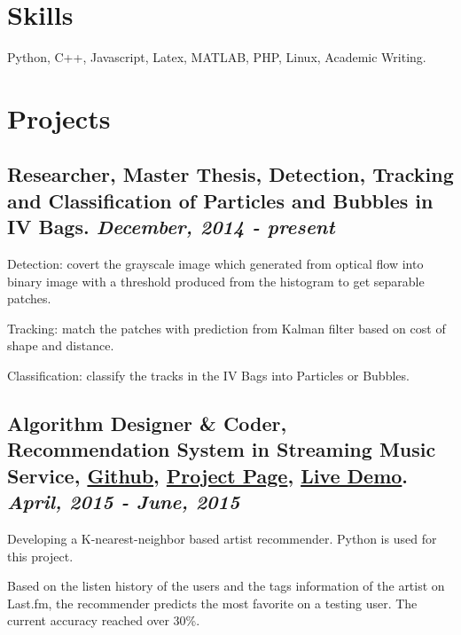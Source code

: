 \documentclass[letterpaper,8pt]{extarticle}
\newlength{\wideitemsep}
\let\olditem\item
\renewcommand{\item}{\setlength{\itemsep}{\wideitemsep}\olditem}
\renewenvironment{itemize}{
  \begin{list}{}{
    \setlength{\leftmargin}{1.5em}
  }
}{
  \end{list}
}
\begin{document}
\section*{Skills \noindent\hrulefill}
\begin{itemize}
	\item[$\circ$] Python, C++, Javascript, Latex, MATLAB, PHP, Linux, Academic Writing.
\end{itemize}

\section*{Projects \noindent\hrulefill}

\subsection*{\textbf{Researcher, Master Thesis}, Detection, Tracking and Classification of Particles and Bubbles in IV Bags. \hfill {\it December, 2014 - present}}
\begin{itemize}
	\item[$\circ$] Detection: covert the grayscale image which generated from optical flow into binary image with a threshold produced from the histogram to get separable patches.
	\item[$\circ$] Tracking: match the patches with prediction from Kalman filter based on cost of shape and distance.
	\item[$\circ$] Classification: classify the tracks in the IV Bags into Particles or Bubbles.
\end{itemize}

\subsection*{\textbf{Algorithm Designer \& Coder}, Recommendation System in Streaming Music Service,
\href{https://github.com/Yaliang/last.fm-recommender}{\color[rgb]{0.2, 0.7, 0.7} Github}, \href{http://smarturl.it/coolrecommender}{\color[rgb]{0.2, 0.7, 0.7} Project Page}, \href{http://yaliang.github.io/last.fm-recommender/Dashboard.html}{\color[rgb]{0.2, 0.7, 0.7} Live Demo}. \hfill {\it April, 2015 - June, 2015}}
\begin{itemize}
	\item[$\circ$] Developing a K-nearest-neighbor based artist recommender. Python is used for this project. 
	\item[$\circ$] Based on the listen history of the users and the tags information of the artist on Last.fm, the recommender predicts the most favorite on a testing user. The current accuracy reached over 30\%.
\end{itemize}
\end{document}
